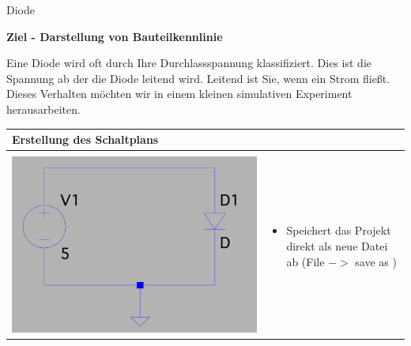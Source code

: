 \begin{frame}[t]{Diode}

  \textbf{Ziel - Darstellung von Bauteilkennlinie}

  \begin{spacing}{0.6} \begin{tiny}

      Eine Diode wird oft durch Ihre Durchlassspannung klassifiziert. Dies ist die Spannung ab der die Diode leitend wird. Leitend ist Sie, wenn ein Strom fließt. Dieses Verhalten möchten
      wir in einem kleinen simulativen Experiment herausarbeiten.
    \end{tiny} \end{spacing}
  \begin{spacing}{0.9} \begin{tiny}
      \begin{table}[h!]
        \begin{tabular}{p{3cm} p{7cm}}
          \hline
          \textbf{Erstellung des Schaltplans}   & \\
          \hline                                  \\
          \begin{minipage}{.3\textwidth}
            \includegraphics[width=\linewidth]{pictures/diode.png}
          \end{minipage}
                                                &
          \begin{minipage}{.7\textwidth}
            \begin{itemize}
              \item Speichert das Projekt direkt als neue Datei ab (File $->$ save as )

\end{itemize}
\end{minipage}
\end{tabular}
\end{table}
\end{tiny}
\end{spacing}
\end{frame}
